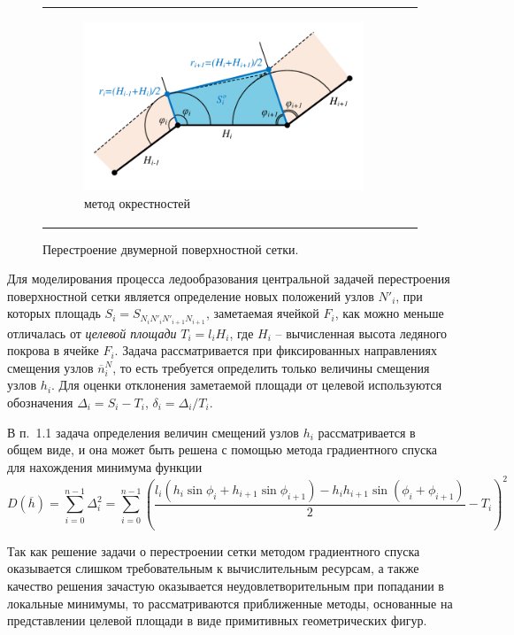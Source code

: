 \documentclass[a4paper,14pt]{extarticle}                     %
\theoremstyle{plain}                                         %
\begin{document}
\begin{figure}[ht]
\begin{tabular}{ll}
\begin{subfigure}{0.45\textwidth}\centering\includegraphics[width=0.75\columnwidth]{pics/text_1_remesh_2d/remesh_okrestnost.pdf}\caption{метод окрестностей}\end{subfigure}
\end{tabular}
\singlespacing
\caption{Перестроение двумерной поверхностной сетки.}
\label{fig:remesh_2d}
\end{figure}

Для моделирования процесса ледообразования центральной задачей перестроения поверхностной сетки является определение новых положений узлов $N'_i$, при которых площадь $S_i = S_{N_iN'_iN'_{i+1}N_{i+1}}$, заметаемая ячейкой $F_i$, как можно меньше отличалась от \textit{целевой площади} $T_i = l_i H_i$, где $H_i$ -- вычисленная высота ледяного покрова в ячейке $F_i$.
Задача рассматривается при фиксированных направлениях смещения узлов $\overline{n}_i^N$, то есть требуется определить только величины смещения узлов $h_i$.
Для оценки отклонения заметаемой площади от целевой используются обозначения $\Delta_i = S_i - T_i$, $\delta_i = \Delta_i / T_i$.


В п.~1.1 задача определения величин смещений узлов $h_i$ рассматривается в общем виде, и она может быть решена с помощью метода градиентного спуска для нахождения минимума функции
\begin{equation*}
	D(\overline{h}) = \sum_{i = 0}^{n - 1}{\Delta_i^2} = \sum_{i = 0}^{n - 1}{ \left( \frac{ l_i(h_i \sin \phi_i + h_{i + 1} \sin \phi_{i+1}) - h_ih_{i + 1} \sin(\phi_i + \phi_{i+1}) }{2} - T_i \right)^2}
\end{equation*}

Так как решение задачи о перестроении сетки методом градиентного спуска оказывается слишком требовательным к вычислительным ресурсам, а также качество решения зачастую оказывается неудовлетворительным при попадании в локальные минимумы, то рассматриваются приближенные методы, основанные на представлении целевой площади в виде примитивных геометрических фигур.
\end{document}
